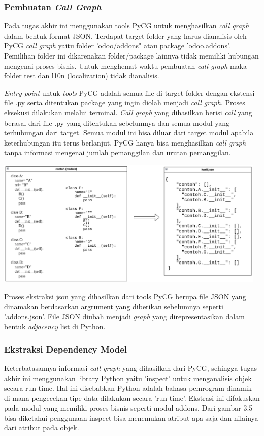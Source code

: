 \subsubsection{Pembuatan \textit{Call Graph}}
Pada tugas akhir ini menggunakan tools PyCG untuk menghasilkan \textit{call graph} dalam bentuk format JSON. Terdapat target folder yang harus dianalisis oleh PyCG \textit{call graph} yaitu folder 'odoo/addons" atau package 'odoo.addons'. Pemilihan folder ini dikarenakan folder/package lainnya tidak memiliki hubungan mengenai proses bisnis. Untuk menghemat waktu pembuatan \textit{call graph} maka folder test dan l10n (localization) tidak dianalisis.  

\textit{Entry point} untuk \textit{tools} PyCG adalah semua file di target folder dengan ekstensi file .py serta ditentukan package yang ingin diolah menjadi \textit{call graph}. Proses eksekusi dilakukan melalui terminal. \textit{Call graph} yang dihasilkan berisi \textit{call} yang berasal dari file .py yang ditentukan sebelumnya dan semua modul yang terhubungan dari target. Semua modul ini bisa diluar dari target modul apabila keterhubungan itu terus berlanjut. PyCG hanya bisa menghasilkan \textit{call graph} tanpa informasi mengenai jumlah pemanggilan dan urutan pemanggilan.

\begin{center}
	\includegraphics[width=13cm]{img/bab_3/soToCG.png}
	\label{contoh_json_pycg}
\end{center}

Proses ekstraksi json yang dihasilkan dari tools PyCG berupa file JSON yang dinamakan berdasarkan argrument yang diberikan sebelumnya seperti 'addons.json'. File JSON diubah menjadi \textit{graph} yang direpresentasikan dalam bentuk \textit{adjacency} list di Python.

\subsubsection{Ekstraksi Dependency Model}
Keterbatasannya informasi \textit{call graph} yang dihasilkan dari PyCG, sehingga tugas akhir ini menggunakan library Python yaitu 'inspect' untuk menganalisis objek secara run-time. Hal ini disebabkan Python adalah bahasa pemrogram dinamik di mana pengecekan tipe data dilakukan secara 'run-time'. Ekstrasi ini difokuskan pada modul yang memiliki proses bisnis seperti modul addons. Dari gambar 3.5 bisa diketahui penggunaan inspect bisa menemukan atribut apa saja dan nilainya dari atribut pada objek. 

